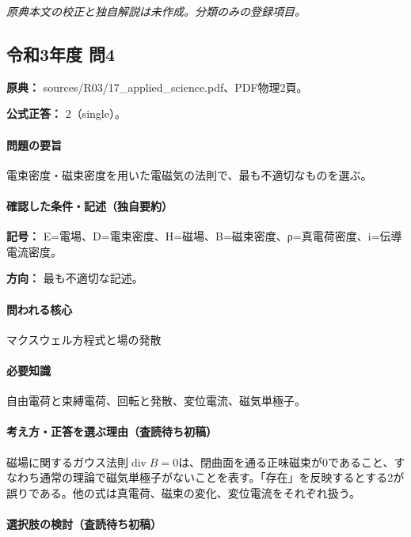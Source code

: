 \par\textit{原典本文の校正と独自解説は未作成。分類のみの登録項目。}

\subsection{令和3年度 問4}
\label{q:r03-reg-applied-04}

\noindent\textbf{原典：} sources/R03/17\_applied\_science.pdf、PDF物理2頁。

\textbf{公式正答：} 2（single）。

\paragraph{問題の要旨} 電束密度・磁束密度を用いた電磁気の法則で、最も不適切なものを選ぶ。

\paragraph{確認した条件・記述（独自要約）}\mbox{}\par

\noindent\textbf{記号：} E=電場、D=電束密度、H=磁場、B=磁束密度、ρ=真電荷密度、i=伝導電流密度。\par

\noindent\textbf{方向：} 最も不適切な記述。\par

\paragraph{問われる核心} マクスウェル方程式と場の発散

\paragraph{必要知識} 自由電荷と束縛電荷、回転と発散、変位電流、磁気単極子。

\paragraph{考え方・正答を選ぶ理由（査読待ち初稿）} 磁場に関するガウス法則\(\operatorname{div}B=0\)は、閉曲面を通る正味磁束が0であること、すなわち通常の理論で磁気単極子がないことを表す。「存在」を反映するとする2が誤りである。他の式は真電荷、磁束の変化、変位電流をそれぞれ扱う。

\paragraph{選択肢の検討（査読待ち初稿）}\mbox{}\par


